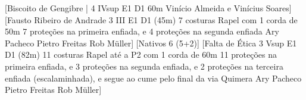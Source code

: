 
\begin{CGSectorRoutes}
    [Biscoito de Gengibre | 4 IVsup E1 D1 60m Vinício Almeida e 
Vinícius Soares]
    [Fausto Ribeiro de Andrade 
3 III E1 D1 (45m) 7 costuras 
Rapel com 1 corda de 50m 7 proteções na primeira enfiada, e 
4 proteções na segunda enfiada Ary Pacheco
Pietro Freitas
Rob Müller]
    [Nativos 6 (5+2)]
    [Falta de Ética
3 Vsup E1 D1 (82m) 11 costuras 
Rapel até a P2 com 1 corda de 60m 11 proteções na primeira enfiada, e 
3 proteções na segunda enfiada, e 
2 proteções na terceira enfiada (escalaminhada),
e segue ao cume pelo final da via Quimera Ary Pacheco
Pietro Freitas
Rob Müller]
\end{CGSectorRoutes}


